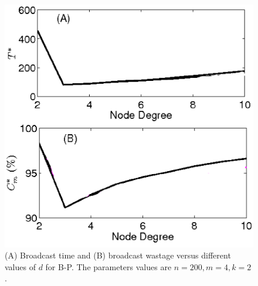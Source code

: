 \begin{figure}
\centering
\includegraphics[scale=0.4]{./texfiles/Chapter_3/netsci/figs1/DiffTopologyRegularTree_delay_cost_N200_m4_k2_varyD_ps_plRes1.eps}
\caption{(A) Broadcast time and (B) broadcast wastage versus different values of $d$ for B-P. The parameters values are $n=200, m=4, k=2$.}
\label{DiffTopologyTree_N200_varyD_push_pull}
\end{figure}

